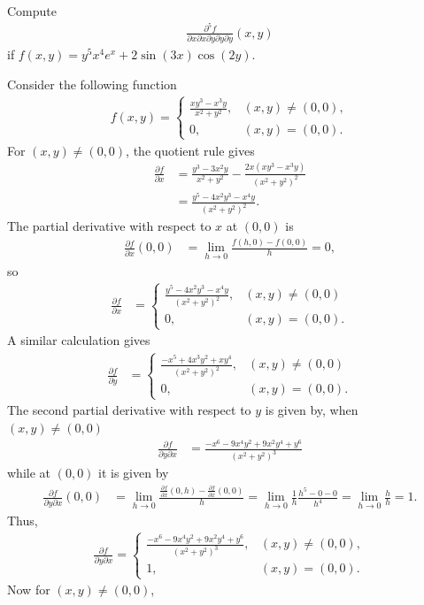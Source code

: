 \documentclass[12pt,letterpaper,reqno]{article}
\numberwithin{equation}{section}
\begin{document}
{\begin{exercise}
Compute 
\begin{align*}
	\frac{\partial^5 f}{\partial x \partial x \partial y \partial y \partial y}(x,y)
\end{align*}
if $f(x,y)=y^5x^4e^x+2\sin(3x)\cos(2y)$.	
\end{exercise}

\begin{example}
Consider the following function
\begin{align*}
	f(x,y)=\begin{cases}
		\frac{xy^3-x^3y}{x^2+y^2}, &(x,y)\neq (0,0), \\
		0, &(x,y)=(0,0).
	\end{cases}
\end{align*}
For $(x,y) \neq (0,0)$, the quotient rule gives
\begin{align*}
\frac{\partial f}{\partial x}&=\frac{y^3-3x^2y}{x^2+y^2}-\frac{2x(xy^3-x^3y)}{(x^2+y^2)^2} \\
&=\frac{y^5-4x^2y^3-x^4y}{(x^2+y^2)^2}.
\end{align*}
The partial derivative with respect to $x$ at $(0,0)$ is 
\begin{align*}
	\frac{\partial f}{\partial x}(0,0)&=\lim_{h \to 0}\frac{f(h,0)-f(0,0)}{h}=0,
\end{align*}	
so 
\begin{align*}
	\frac{\partial f}{\partial x}&=
	\begin{cases}
	\frac{y^5-4x^2y^3-x^4y}{(x^2+y^2)^2}, &(x,y)\neq (0,0) \\
		0, &(x,y)=(0,0).
	\end{cases}
\end{align*}
A similar calculation gives
\begin{align*}
	\frac{\partial f}{\partial y}&=\begin{cases}
		\frac{-x^5+4x^3y^2+xy^4}{(x^2+y^2)^2}, &(x,y)\neq (0,0) \\
		0, &(x,y)=(0,0).
	\end{cases}
\end{align*}
The second partial derivative with respect to $y$ is given by, when $(x,y) \neq (0,0)$
\begin{align*}
	\frac{\partial f}{\partial y \partial x}&=\frac{-x^6-9x^4y^2+9x^2y^4+y^6}{(x^2+y^2)^3}
\end{align*}
while at $(0,0)$ it is given by
\begin{align*}
	\frac{\partial f}{\partial y \partial x}(0,0)&=\lim_{h \to 0}\frac{\frac{\partial f}{\partial x}(0,h)-\frac{\partial f}{\partial x}(0,0)}{h}=\lim_{h \to 0}\frac{1}{h}\frac{h^5-0-0}{h^4}=\lim_{h \to 0}\frac{h}{h}=1.
\end{align*}
Thus,
\begin{align*}
	\frac{\partial f}{\partial y \partial x}=\begin{cases}
		\frac{-x^6-9x^4y^2+9x^2y^4+y^6}{(x^2+y^2)^3}, &(x,y) \neq (0,0), \\
		1, &(x,y)=(0,0).
	\end{cases}
\end{align*}
Now for $(x,y) \neq (0,0)$,


\end{example}}
\end{document}
